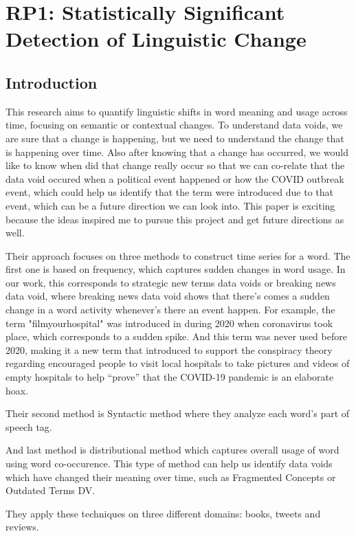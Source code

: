 
\section{RP1: Statistically Significant Detection of Linguistic Change} \label{sec:paper_kulkarni}
\subsection{Introduction} \label{subsec:introduction}
This research aims to quantify linguistic shifts in word meaning and usage across time, focusing on semantic or contextual changes.
To understand data voids, we are sure that a change is happening, but we need to understand the change that is happening over time.
Also after knowing that a change has occurred, we would like to know when did that change really occur so that we can co-relate that the data void occured when a political event happened or how the COVID outbreak event,
which could help us identify that the term were introduced due to that event, which can be a future direction we can look into.
This paper is exciting because the ideas inspired me to pursue this project and get future directions as well.

Their approach focuses on three methods to construct time series for a word.
The first one is based on frequency, which captures sudden changes in word usage.
In our work, this corresponds to strategic new terms data voids or breaking news data void,
where breaking news data void shows that there's comes a sudden change in a word activity whenever's there an event happen.
For example, the term "filmyourhospital" was introduced in during 2020 when coronavirus took place, which corresponds to a sudden spike.
And this term was never used before 2020, making it a new term that introduced to support the conspiracy theory regarding encouraged people to visit local hospitals to take pictures and videos of empty hospitals to help “prove” that the COVID-19 pandemic is an elaborate hoax.

Their second method is Syntactic method where they analyze each word's part of speech tag.

And last method is distributional method which captures overall usage of word using word co-occurence.
This type of method can help us identify data voids which have changed their meaning over time, such as Fragmented Concepts or Outdated Terms DV.

They apply these techniques on three different domains: books, tweets and reviews.

